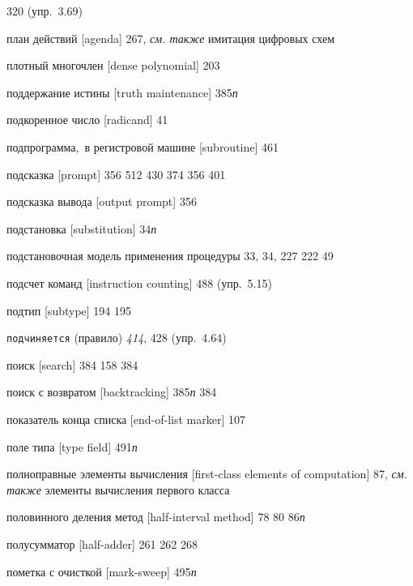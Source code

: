 \begin{theindex}
   320 (упр.~3.69)
\item {план действий [agenda]} 267, {\it см. также} имитация цифровых схем
\item {плотный многочлен [dense polynomial]} 203
\item {поддержание истины [truth maintenance]} 385{\it п}
\item {подкоренное число [radicand]} 41
\item {подпрограмма,~в регистровой машине [subroutine]} 461
\item {подсказка [prompt]} 356
   512
   430
   374
   356
   401
\item {подсказка вывода [output prompt]} 356
\item {подстановка [substitution]} 34{\it п}
\item {подстановочная модель применения процедуры} 33, 34, 227
   222
   49
\item {подсчет команд [instruction counting]} 488 (упр.~5.15)
\item {подтип [subtype]} 194
   195
\item {\texttt{подчиняется} (правило)} {\it 414}, 428 (упр.~4.64)
\item {поиск [search]}
   384
   158
   384
\item {поиск с возвратом [backtracking]}
   385{\it п}
   384
\item {показатель конца списка [end-of-list marker]} 107
\item {поле типа [type field]} 491{\it п}
\item {полноправные элементы вычисления [first-class elements of computation]} 87, {\it см. также} элементы вычисления первого класса
\item {половинного деления метод [half-interval method]} 78
   80
   86{\it п}
\item {полусумматор [half-adder]} 261
   262
   268
\item {пометка с очисткой [mark-sweep]} 495{\it п}

\end{theindex}
